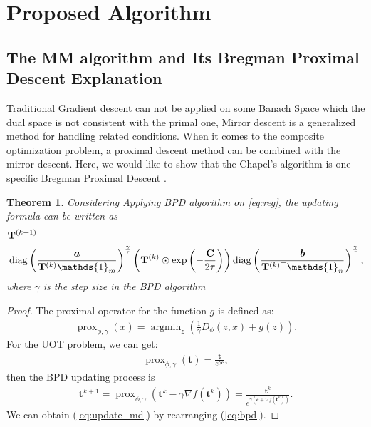 \documentclass[conference]{IEEEtran}
\newtheorem{thm}{Theorem}
\newcommand{\one}{\mathds{1}}
\newcommand{\mat}[1]{\mathbf{#1}}
\renewcommand{\vec}[1]{\bm{#1}}
\newcommand{\prox}{\operatorname{prox}}
\newcommand{\argmin}{\operatorname{argmin}}
\begin{document}
\section{Proposed Algorithm}
\subsection{The MM algorithm and Its Bregman Proximal Descent Explanation}
Traditional Gradient descent can not be applied on some Banach Space which the dual space is not consistent with the primal one, Mirror descent\cite{doi:10.1137/1027074, BECK2003167} is a generalized method for handling related conditions. When it comes to the composite optimization problem, a proximal descent method can be combined with the mirror descent. Here, we would like to show that the Chapel's algorithm is one specific Bregman Proximal Descent \cite{DBLP:journals/coap/HanzelyRX21}.


\begin{thm}
Considering Applying BPD algorithm on {\ref{eq:reg}}, the updating formula can be written as
\begin{align}
\label{eq:update_md}
&\mat{T}^{(k+1)}=\notag\\
&\operatorname{diag}\left(\frac{\vec a}{\mat{T}^{(k)} \one_m}\right)^{\frac{\gamma}{\tau}}\left(\mat{T}^{(k)} \odot \exp \left(-\frac{\mat C}{2 \tau}\right)\right)
\operatorname{diag}\left(\frac{\vec{b}}{\mat{T}^{(k) \top} \one_n}\right)^{\frac{\gamma}{\tau}},\notag\\
\end{align}
where $\gamma$ is the step size in the BPD algorithm
\end{thm}
\begin{proof}
The proximal operator for the function $g$ is defined as:
\begin{align}
\prox_{\phi,\gamma}(x) = \argmin_{z}{(\frac{1}{\gamma}D_\phi(z,x)+g(z))}.
\end{align}
For the UOT problem, we can get:
\begin{align}
\prox_{\phi,\gamma}(\vec t) = \frac{\vec t}{e^{{\gamma \vec c}}},
\end{align}
then the BPD updating process is
\begin{align}
\label{eq:bpd}
\vec t^{k+1} = \prox_{\phi,\gamma}(\mat t^{k} - \gamma \nabla f(\vec t^{k})) = \frac{\vec t^{k}}{e^{\gamma ({\vec c + \nabla f(\vec t^{k})})}}.
\end{align}
We can obtain (\ref{eq:update_md}) by rearranging (\ref{eq:bpd}).
\end{proof}
\end{document}
